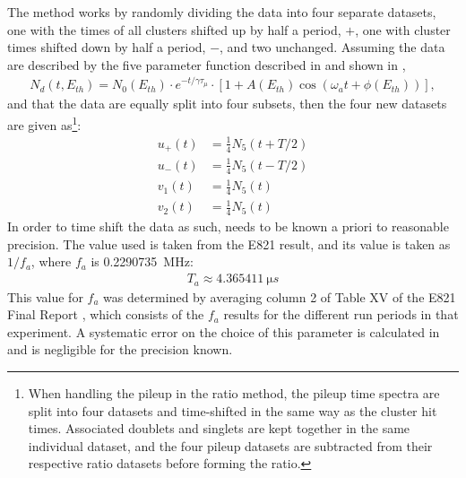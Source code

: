 The method works by randomly dividing the data into four separate datasets, one with the times of all clusters shifted up by half a \gmtwo period, $+$\Tatwo, one with cluster times shifted down by half a \gmtwo period, $-$\Tatwo, and two unchanged. Assuming the data are described by the five parameter function described in  and shown in , %
        \begin{align} \label{eq:5parfuncrepeated}
            N_{d}(t, E_{th}) = N_{0}(E_{th}) \cdot e^{-t/\gamma\tau_{\mu}} \cdot [1 + A(E_{th}) \cos(\omega_{a}t+\phi(E_{th}))],
        \end{align}
and that the data are equally split into four subsets, then the four new datasets are given as\footnote{When handling the pileup in the ratio method, the pileup time spectra are split into four datasets and time-shifted in the same way as the cluster hit times. Associated doublets and singlets are kept together in the same individual dataset, and the four pileup datasets are subtracted from their respective ratio datasets before forming the ratio.}:
    \begin{equation}
    \begin{aligned}
        u_{+}(t) &= \frac{1}{4} N_{5}(t+T/2) \\
        u_{-}(t) &= \frac{1}{4} N_{5}(t-T/2) \\
        v_{1}(t) &= \frac{1}{4} N_{5}(t) \\
        v_{2}(t) &= \frac{1}{4} N_{5}(t)
    \end{aligned}
    \end{equation}
In order to time shift the data as such, \Ta needs to be known a priori to reasonable precision. The value used is taken from the E821 result, and its value is taken as $1/f_{a}$, where $f_{a}$ is \SI{0.2290735}{MHz}:
        \begin{align}
            T_{a} \approx \SI{4.365411}{\micro s}
        \label{eq:Ta}
        \end{align}
This value for $f_{a}$ was determined by averaging column 2 of Table XV of the E821 Final Report \cite{E821FinalReport}, which consists of the $f_{a}$ results for the different run periods in that experiment. A systematic error on the choice of this parameter is calculated in  and is negligible for the precision known.


